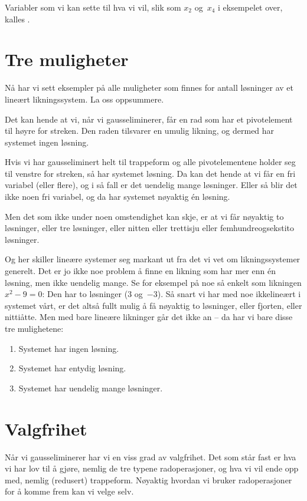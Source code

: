 Variabler som vi kan sette til hva vi vil, slik som $x_2$ og~$x_4$ i
eksempelet over, kalles .


\section*{Tre muligheter}

Nå har vi sett eksempler på alle muligheter som finnes for antall
løsninger av et lineært likningssystem.  La oss oppsummere.

Det kan hende at vi, når vi gausseliminerer, får en rad som har et
pivotelement til høyre for streken.  Den raden tilsvarer en umulig
likning, og dermed har systemet ingen løsning.

Hvis vi har gausseliminert helt til trappeform og alle pivotelementene
holder seg til venstre for streken, så har systemet løsning.  Da kan
det hende at vi får en fri variabel (eller flere), og i så fall er det
uendelig mange løsninger.  Eller så blir det ikke noen fri variabel,
og da har systemet nøyaktig én løsning.

Men det som ikke under noen omstendighet kan skje, er at vi får
nøyaktig to løsninger, eller tre løsninger, eller nitten eller
trettisju eller femhundreogsekstito løsninger.

Og her skiller lineære systemer seg markant ut fra det vi vet om
likningssystemer generelt.  Det er jo ikke noe problem å finne en
likning som har mer enn én løsning, men ikke uendelig mange.  Se for
eksempel på noe så enkelt som likningen $x^2 - 9 = 0$: Den har to
løsninger ($3$ og~$-3$).  Så snart vi har med noe ikkelineært i
systemet vårt, er det altså fullt mulig å få nøyaktig to løsninger,
eller fjorten, eller nittiåtte.  Men med bare lineære likninger går
det ikke an -- da har vi bare disse tre mulighetene:
\begin{enumerate}
\item Systemet har ingen løsning.
\item Systemet har entydig løsning.
\item Systemet har uendelig mange løsninger.
\end{enumerate}


\section*{Valgfrihet}

Når vi gausseliminerer har vi en viss grad av valgfrihet.  Det som
står fast er hva vi har lov til å gjøre, nemlig de tre typene
radoperasjoner, og hva vi vil ende opp med, nemlig (redusert)
trappeform.  Nøyaktig hvordan vi bruker radoperasjoner for å komme
frem kan vi velge selv.

